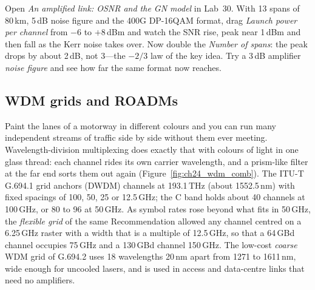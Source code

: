 
\begin{tryit}
Open \emph{An amplified link: OSNR and the GN model} in Lab~30. With 13 spans of 80\,km, 5\,dB noise
figure and the 400G DP-16QAM format, drag \emph{Launch power per channel} from $-6$ to $+8$\,dBm and
watch the SNR rise, peak near 1\,dBm and then fall as the Kerr noise takes over. Now double the
\emph{Number of spans}: the peak drops by about 2\,dB, not 3---the $-2/3$ law of the key idea. Try a
3\,dB amplifier \emph{noise figure} and see how far the same format now reaches.
\end{tryit}

\subsection{WDM grids and ROADMs}

Paint the lanes of a motorway in different colours and you can run many independent streams of
traffic side by side without them ever meeting. Wavelength-division multiplexing does exactly that
with colours of light in one glass thread: each channel rides its own carrier wavelength, and a
prism-like filter at the far end sorts them out again (Figure~\ref{fig:ch24_wdm_comb}).
The ITU-T G.694.1 grid anchors  (DWDM) channels at 193.1\,THz (about 1552.5\,nm) with
fixed spacings of 100, 50, 25 or 12.5\,GHz; the C band holds about 40 channels at 100\,GHz, or 80 to 96 at
50\,GHz. As symbol rates rose beyond what fits in 50\,GHz, the \emph{flexible grid} of the same
Recommendation allowed any channel centred on a 6.25\,GHz raster with a width that is a multiple of
12.5\,GHz, so that a 64\,GBd channel occupies 75\,GHz and a 130\,GBd channel 150\,GHz. The low-cost
\emph{coarse} WDM grid of G.694.2 uses 18 wavelengths 20\,nm apart from 1271 to 1611\,nm, wide enough for
uncooled lasers, and is used in access and data-centre links that need no amplifiers.

